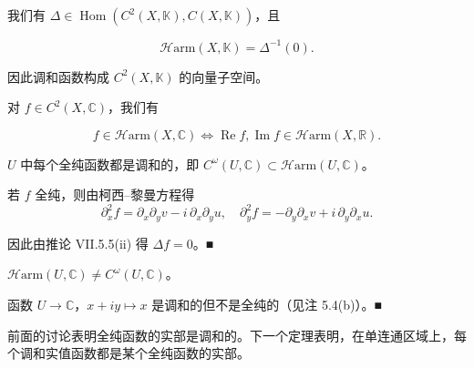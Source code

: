 \begin{remark}

\begin{items}
\item

我们有 $ \Delta \in \operatorname{Hom}\left(C^{2}(X,\mathbb{K}),C(X,\mathbb{K})\right) $，且

\[
\mathcal{H}\mathrm{arm}(X,\mathbb{K}) = \Delta^{-1}(0) .
\]

因此调和函数构成 $ C^{2}(X,\mathbb{K}) $ 的向量子空间。

\item

对 $ f \in C^{2}(X,\mathbb{C}) $，我们有

\[
f \in \mathcal{H}\mathrm{arm}(X,\mathbb{C}) \iff \operatorname{Re} f, \operatorname{Im} f \in \mathcal{H}\mathrm{arm}(X,\mathbb{R}) .
\]
\item

$ U $ 中每个全纯函数都是调和的，即 $ C^{\omega}(U,\mathbb{C}) \subset \mathcal{H}\mathrm{arm}(U,\mathbb{C}) $。

\proofhead
若 $ f $ 全纯，则由柯西–黎曼方程得
\[
\partial_{x}^{2}f = \partial_{x}\partial_{y}v - i\,\partial_{x}\partial_{y}u , \quad \partial_{y}^{2}f = -\partial_{y}\partial_{x}v + i\,\partial_{y}\partial_{x}u .
\]

因此由推论 VII.5.5(ii) 得 $ \Delta f = 0 $。\nobreak\hspace{0.35em}■

\item

$ \mathcal{H}\mathrm{arm}(U,\mathbb{C}) \ne C^{\omega}(U,\mathbb{C}) $。

\proofhead
函数 $ U \to \mathbb{C} $，$ x + iy \mapsto x $ 是调和的但不是全纯的（见注 5.4(b)）。\nobreak\hspace{0.35em}■
\end{items}

前面的讨论表明全纯函数的实部是调和的。下一个定理表明，在单连通区域上，每个调和实值函数都是某个全纯函数的实部。

\end{remark}

